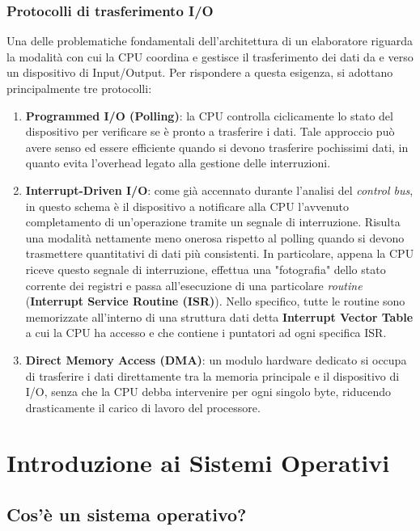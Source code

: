 \documentclass[12pt]{report}
\begin{document}
	\subsection{Protocolli di trasferimento I/O}
	
	Una delle problematiche fondamentali dell'architettura di un elaboratore riguarda la modalità con cui la CPU coordina e gestisce il trasferimento dei dati da e verso un dispositivo di Input/Output. Per rispondere a questa esigenza, si adottano principalmente tre protocolli:
	
	\begin{enumerate}
		\item \textbf{Programmed I/O (Polling)}: la CPU controlla ciclicamente lo stato del dispositivo per verificare se è pronto a trasferire i dati. Tale approccio può avere senso ed essere efficiente quando si devono trasferire pochissimi dati, in quanto evita l'overhead legato alla gestione delle interruzioni.
		
		\item \textbf{Interrupt-Driven I/O}: come già accennato durante l'analisi del \textit{control bus}, in questo schema è il dispositivo a notificare alla CPU l'avvenuto completamento di un'operazione tramite un segnale di interruzione. Risulta una modalità nettamente meno onerosa rispetto al polling quando si devono trasmettere quantitativi di dati più consistenti.
		In particolare, appena la CPU riceve questo segnale di interruzione, effettua una "fotografia" dello stato corrente dei registri e passa all'esecuzione di una particolare \textit{routine} (\textbf{Interrupt Service Routine (ISR)}).
		Nello specifico, tutte le routine sono memorizzate all'interno di una struttura dati detta \textbf{Interrupt Vector Table} a cui la CPU ha accesso e che contiene i puntatori ad ogni specifica ISR.
		
		\item \textbf{Direct Memory Access (DMA)}: un modulo hardware dedicato si occupa di trasferire i dati direttamente tra la memoria principale e il dispositivo di I/O, senza che la CPU debba intervenire per ogni singolo byte, riducendo drasticamente il carico di lavoro del processore.
	\end{enumerate}
	
	\chapter{Introduzione ai Sistemi Operativi}
	
	\section{Cos'è un sistema operativo?}
	
\end{document}

